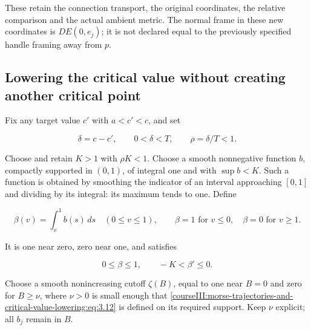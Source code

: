 These retain the connection transport, the original coordinates, the relative comparison and the actual ambient metric. The normal frame in these new coordinates is \(DE(0,e_j)\); it is not declared equal to the previously specified handle framing away from \(p\).

\subsection{Lowering the critical value without creating another critical point}
\label{courseIII:morse-trajectories-and-critical-value-lowering:trajectory-supported-lowering}

\label{courseIII:morse-trajectories-and-critical-value-lowering:section-4}\label{courseIII:trajectory-lowering:4}

Fix any target value \(c'\) with \(a<c'<c\), and set

\begin{equation}
\delta=c-c',\qquad 0<\delta<T,\qquad \rho=\delta/T<1.
 \label{courseIII:morse-trajectories-and-critical-value-lowering:eq:4.1}
\end{equation}

Choose and retain \(K>1\) with \(\rho K<1\). Choose a smooth nonnegative function \(b\), compactly supported in \((0,1)\), of integral one and with \(\sup b<K\). Such a function is obtained by smoothing the indicator of an interval approaching \([0,1]\) and dividing by its integral: its maximum tends to one. Define

\begin{equation}
\beta(v)=\int_v^1 b(s)\,ds\quad(0\leq v\leq1),
 \qquad
 \beta=1\text{ for }v\leq0,\quad
 \beta=0\text{ for }v\geq1.
 \label{courseIII:morse-trajectories-and-critical-value-lowering:eq:4.2}
\end{equation}

It is one near zero, zero near one, and satisfies

\begin{equation}
0\leq\beta\leq1,\qquad -K<\beta'\leq0.
 \label{courseIII:morse-trajectories-and-critical-value-lowering:eq:4.3}
\end{equation}

Choose a smooth nonincreasing cutoff \(\zeta(B)\), equal to one near \(B=0\) and zero for \(B\geq\nu\), where \(\nu>0\) is small enough that \eqref{courseIII:morse-trajectories-and-critical-value-lowering:eq:3.12} is defined on its required support. Keep \(\nu\) explicit; all \(b_j\) remain in \(B\).

